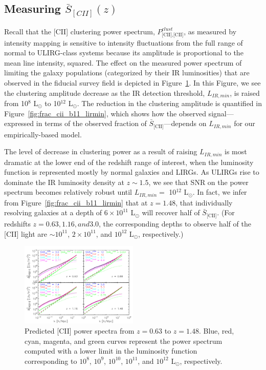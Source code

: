 \documentclass[12pt,preprint]{emulateapj}
\begin{document}
\subsection{Measuring $\bar{S}_{[CII]}(z)$}

Recall that the [CII] clustering power spectrum, $P_{\textrm{[CII],[CII]}}^{clust}$, as measured by intensity mapping is sensitive to intensity fluctuations from the full range of normal to ULIRG-class systems because its amplitude is proportional to the mean line intensity, squared. The effect on the measured power spectrum of limiting the galaxy populations (categorized by their IR luminosities) that are observed in the fiducial survey field is depicted in Figure~\ref{fig:pcii_lirmin}. In this Figure, we see the clustering amplitude decrease as the IR detection threshold, $L_{IR, min}$, is raised from 10$^{8}$ L$_{\odot}$ to 10$^{12}$ L$_{\odot}$.  The reduction in the clustering amplitude is quantified in Figure~\ref{fig:frac_cii_b11_lirmin}, which shows how the observed signal---expressed in terms of the observed fraction of $\bar{S}_{\textrm{[CII]}}$---depends on $L_{IR,min}$ for our empirically-based model.

The level of decrease in clustering power as a result of raising $L_{IR,min}$ is most dramatic at the lower end of the redshift range of interest, when the luminosity function is represented mostly by normal galaxies and LIRGs. As ULIRGs rise to dominate the IR luminosity density at $z \sim 1.5$, we see that SNR on the power spectrum becomes relatively robust until $L_{IR,min} =$ 10$^{12}$ L$_{\odot}$. In fact, we infer from Figure~\ref{fig:frac_cii_b11_lirmin} that at $z = 1.48$, that individually resolving galaxies at a depth of $6\times10^{11}$ L$_{\odot}$ will recover half of $\bar{S}_{\textrm{[CII]}}$. (For redshifts $z = 0.63, 1.16, and 3.0$, the corresponding depths to observe half of the [CII] light are $\sim 10^{11}$, $2\times10^{11}$, and $10^{12}$ L$_{\odot}$, respectively.)

\begin{figure}
\centering
\includegraphics[width=0.5\textwidth]{pcii_STARFIRE_z63_z88_z116_z148_lirmin_halofit_bethermin_spinoglio_ap2p5m_1sqdeg_uhp_ktnonzero}
\caption{Predicted [CII] power spectra from $z = 0.63$ to $z = 1.48$. Blue, red, cyan, magenta, and green curves represent the power spectrum computed with a lower limit in the luminosity function corresponding to $10^8$, $10^9$, $10^{10}$, $10^{11}$, and $10^{12}$ L$_{\odot}$, respectively.}
\label{fig:pcii_lirmin}
\end{figure}
\end{document}
